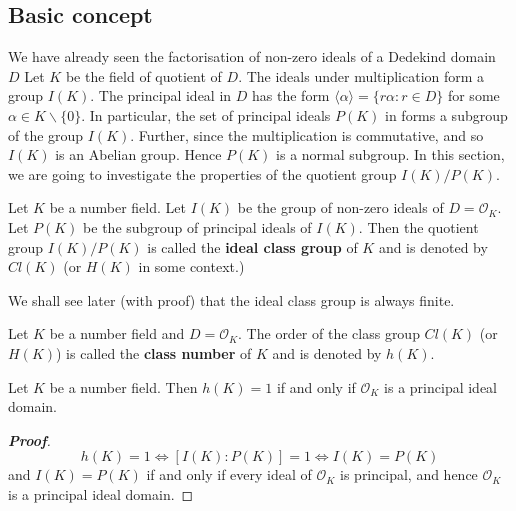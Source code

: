 \subsection{Basic concept}
We have already seen the factorisation of non-zero ideals of a Dedekind domain $D$ Let $K$ be the field of quotient of $D$. The ideals under multiplication form a group $I(K)$.  The principal ideal in $D$ has the form  $\langle \alpha \rangle=\{r\alpha: r \in D\}$ for some $\alpha \in K \backslash\{0\}$.
In particular, the set of principal ideals $P(K)$ in forms a subgroup of the group $I(K)$. Further, since
the multiplication is commutative, and so $I(K)$ is an Abelian group. Hence $P(K)$ is a normal subgroup.
In this section, we are going to investigate the properties of the quotient group $I(K)/P(K)$.
\begin{definition} Let $K$ be a number field. Let $I(K)$ be the group of non-zero ideals of $D=\mathcal{O}_K$.
Let $P(K)$ be the subgroup of principal ideals of $I(K)$. Then the quotient group $I(K)/P(K)$ is called
the {\bf ideal class group} of $K$ and is denoted by $Cl(K)$ (or $H(K)$ in some context.)
\end{definition}
We shall see later (with proof) that the ideal class group is always finite.
\begin{definition} Let $K$ be a number field and $D=\mathcal{O}_K$.  The order of the class group $Cl(K)$ (or $H(K)$) is called the {\bf class number} of $K$ and is denoted by $h(K)$.
\end{definition}
\begin{proposition} Let $K$ be a number field. Then $h(K)=1$ if and only if $\mathcal{O}_K$ is a principal ideal domain.
\end{proposition}
\begin{proof}[\bf Proof] $$h(K)=1 \iff [I(K):P(K)]=1 \iff I(K)=P(K)$$
and $I(K)=P(K)$ if and only if every ideal of $\mathcal{O}_K$ is principal, and hence $\mathcal{O}_K$ is a principal ideal domain.
\end{proof}

